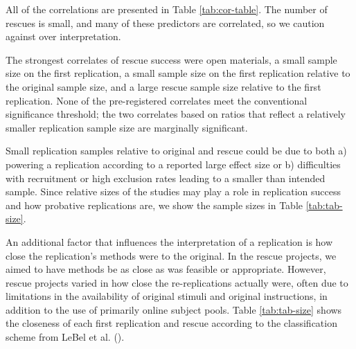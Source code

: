 \documentclass[
  english,
  a4paper,
]{article}
\begin{document}
All of the correlations are presented in Table \ref{tab:cor-table}.
The number of rescues is small, and many of these predictors are correlated, so we caution against over interpretation.

The strongest correlates of rescue success were open materials, a small sample size on the first replication, a small sample size on the first replication relative to the original sample size, and a large rescue sample size relative to the first replication.
None of the pre-registered correlates meet the conventional significance threshold; the two correlates based on ratios that reflect a relatively smaller replication sample size are marginally significant.

Small replication samples relative to original and rescue could be due to both a) powering a replication according to a reported large effect size or b) difficulties with recruitment or high exclusion rates leading to a smaller than intended sample.
Since relative sizes of the studies may play a role in replication success and how probative replications are, we show the sample sizes in Table \ref{tab:tab-size}.

An additional factor that influences the interpretation of a replication is how close the replication's methods were to the original.
In the rescue projects, we aimed to have methods be as close as was feasible or appropriate.
However, rescue projects varied in how close the re-replications actually were, often due to limitations in the availability of original stimuli and original instructions, in addition to the use of primarily online subject pools.
Table \ref{tab:tab-size} shows the closeness of each first replication and rescue according to the classification scheme from LeBel et al. ().
\end{document}
